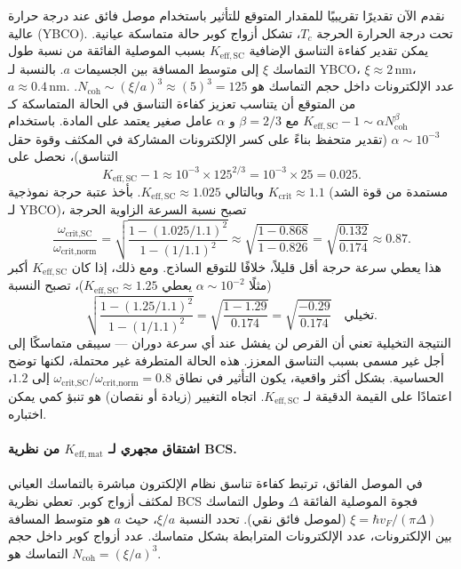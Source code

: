 \documentclass[12pt,a4paper]{article}
\newcommand{\betaf}{\beta}
\begin{document}
	نقدم الآن تقديرًا تقريبيًا للمقدار المتوقع للتأثير باستخدام موصل فائق عند درجة حرارة عالية (YBCO). تحت درجة الحرارة الحرجة \(T_c\)، تشكل أزواج كوبر حالة متماسكة عيانية. يمكن تقدير كفاءة التناسق الإضافية \(K_{\mathrm{eff,SC}}\) بسبب الموصلية الفائقة من نسبة طول التماسك \(\xi\) إلى متوسط المسافة بين الجسيمات \(a\). بالنسبة لـ YBCO، \(\xi \approx 2\,\text{nm}\)، \(a \approx 0.4\,\text{nm}\). عدد الإلكترونات داخل حجم التماسك هو \(N_{\text{coh}} \sim (\xi/a)^3 \approx (5)^3 = 125\). من المتوقع أن يتناسب تعزيز كفاءة التناسق في الحالة المتماسكة كـ \(K_{\mathrm{eff,SC}} - 1 \sim \alpha N_{\text{coh}}^{\betaf}\) مع \(\betaf = 2/3\) و \(\alpha\) عامل صغير يعتمد على المادة. باستخدام \(\alpha \sim 10^{-3}\) (تقدير متحفظ بناءً على كسر الإلكترونات المشاركة في المكثف وقوة حقل التناسق)، نحصل على
	\[
	K_{\mathrm{eff,SC}} - 1 \approx 10^{-3} \times 125^{2/3} = 10^{-3} \times 25 = 0.025.
	\]
	وبالتالي \(K_{\mathrm{eff,SC}} \approx 1.025\). بأخذ عتبة حرجة نموذجية \(K_{\mathrm{crit}} \approx 1.1\) (مستمدة من قوة الشد لـ YBCO)، تصبح نسبة السرعة الزاوية الحرجة
	\[
	\frac{\omega_{\text{crit,SC}}}{\omega_{\text{crit,norm}}} = \sqrt{ \frac{1 - (1.025/1.1)^2}{1 - (1/1.1)^2} } \approx \sqrt{ \frac{1 - 0.868}{1 - 0.826} } = \sqrt{ \frac{0.132}{0.174} } \approx 0.87.
	\]
	هذا يعطي سرعة حرجة أقل قليلاً، خلافًا للتوقع الساذج. ومع ذلك، إذا كان \(K_{\mathrm{eff,SC}}\) أكبر (مثلًا \(\alpha \sim 10^{-2}\) يعطي \(K_{\mathrm{eff,SC}} \approx 1.25\))، تصبح النسبة
	\[
	\sqrt{ \frac{1 - (1.25/1.1)^2}{1 - (1/1.1)^2} } = \sqrt{ \frac{1 - 1.29}{0.174} } = \sqrt{ \frac{-0.29}{0.174} } \quad \text{تخيلي}.
	\]
	النتيجة التخيلية تعني أن القرص لن يفشل عند أي سرعة دوران — سيبقى متماسكًا إلى أجل غير مسمى بسبب التناسق المعزز. هذه الحالة المتطرفة غير محتملة، لكنها توضح الحساسية. بشكل أكثر واقعية، يكون التأثير في نطاق \(\omega_{\text{crit,SC}}/\omega_{\text{crit,norm}} = 0.8\) إلى \(1.2\)، اعتمادًا على القيمة الدقيقة لـ \(K_{\mathrm{eff,SC}}\). اتجاه التغيير (زيادة أو نقصان) هو تنبؤ كمي يمكن اختباره.
	
	\paragraph{اشتقاق مجهري لـ \(K_{\mathrm{eff,mat}}\) من نظرية BCS.}
	في الموصل الفائق، ترتبط كفاءة تناسق نظام الإلكترون مباشرة بالتماسك العياني لمكثف أزواج كوبر. تعطي نظرية BCS فجوة الموصلية الفائقة \(\Delta\) وطول التماسك \(\xi = \hbar v_F / (\pi \Delta)\) (لموصل فائق نقي). تحدد النسبة \(\xi / a\)، حيث \(a\) هو متوسط المسافة بين الإلكترونات، عدد الإلكترونات المترابطة بشكل متماسك. عدد أزواج كوبر داخل حجم التماسك هو \(N_{\text{coh}} = (\xi/a)^3\).
	
\end{document}
